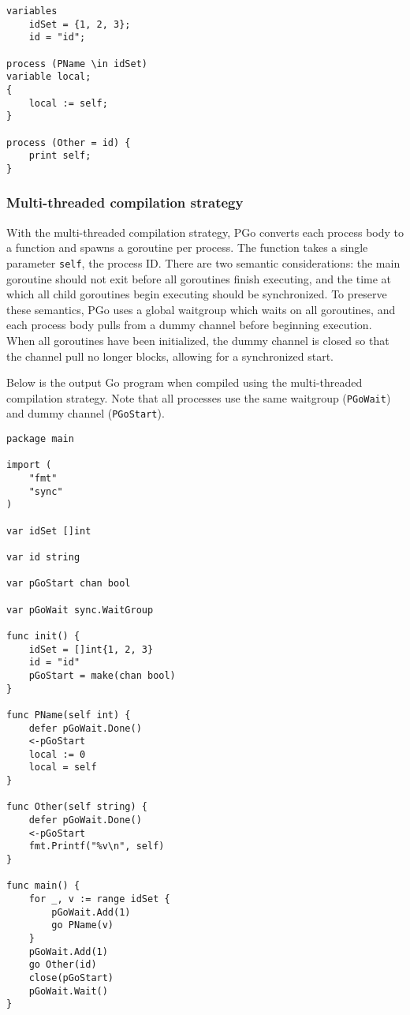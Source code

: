 \noindent
\begin{minipage}[t]{\textwidth}
	\begin{lstlisting}[language=pcal]
variables
	idSet = {1, 2, 3};
	id = "id";

process (PName \in idSet)
variable local;
{
	local := self;
}

process (Other = id) {
	print self;
}
	\end{lstlisting}
\end{minipage}

\subsubsection{Multi-threaded compilation strategy}
With the multi-threaded compilation strategy, PGo converts each process body to a function and spawns a goroutine per process. The function takes a single parameter \texttt{self}, the process ID. There are two semantic considerations: the main goroutine should not exit before all goroutines finish executing, and the time at which all child goroutines begin executing should be synchronized. To preserve these semantics, PGo uses a global waitgroup which waits on all goroutines, and each process body pulls from a dummy channel before beginning execution. When all goroutines have been initialized, the dummy channel is closed so that the channel pull no longer blocks, allowing for a synchronized start.

Below is the output Go program when compiled using the multi-threaded compilation strategy. Note that all processes use the same waitgroup (\texttt{PGoWait}) and dummy channel (\texttt{PGoStart}).

\noindent
\begin{minipage}[t]{\textwidth}
\begin{lstlisting}[language=golang]
package main

import (
	"fmt"
	"sync"
)

var idSet []int

var id string

var pGoStart chan bool

var pGoWait sync.WaitGroup

func init() {
	idSet = []int{1, 2, 3}
	id = "id"
	pGoStart = make(chan bool)
}

func PName(self int) {
	defer pGoWait.Done()
	<-pGoStart
	local := 0
	local = self
}

func Other(self string) {
	defer pGoWait.Done()
	<-pGoStart
	fmt.Printf("%v\n", self)
}

func main() {
	for _, v := range idSet {
		pGoWait.Add(1)
		go PName(v)
	}
	pGoWait.Add(1)
	go Other(id)
	close(pGoStart)
	pGoWait.Wait()
}
\end{lstlisting}
\end{minipage}

